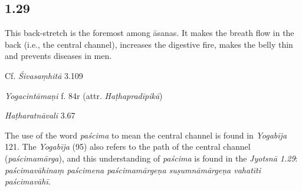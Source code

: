 \begin{ekdosis}
\subsection*{1.29}
\begin{translation}[hp01_029]
This back-stretch is the foremost among āsanas. It makes the breath flow in the back (i.e., the central channel), increases the digestive fire, makes the belly thin and prevents diseases in men.
\end{translation}

\begin{sources}[hp01_029]
Cf. \emph{Śivasaṃhitā} 3.109

\begin{versinnote}
\end{versinnote}

\end{sources}

\begin{testimonia}[hp01_029]
\emph{Yogacintāmaṇi} f. 84r (attr. \emph{Haṭhapradīpikā})

\begin{versinnote}
\end{versinnote}

\emph{Haṭharatnāvalī} 3.67

\begin{versinnote}
\end{versinnote}

\end{testimonia}

\begin{philcomm}[hp01_029]
 The use of the word \emph{paścima} to mean the central channel is found in \emph{Yogabīja} 121. The  \emph{Yogabīja} (95) also refers to the path of the central channel (\emph{paścima\-mārga}), and this understanding of \emph{paścima} is found in the \emph{Jyotsnā 1.29}: \emph{paścimavāhinaṃ paścimena paścimamārgeṇa suṣumnāmārgeṇa vahatīti paścimavāhī}.
\end{philcomm}


\end{ekdosis}
